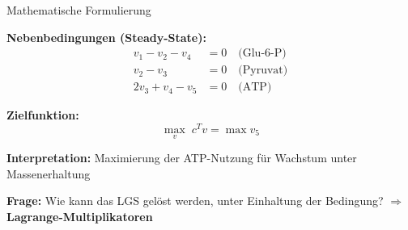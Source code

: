 \begin{frame}{Mathematische Formulierung}

\textbf{Nebenbedingungen (Steady-State):}
\[
\begin{aligned}
v_1 - v_2 - v_4 &= 0 \quad \text{(Glu-6-P)} \\
v_2 - v_3 &= 0 \quad \text{(Pyruvat)} \\
2v_3 + v_4 - v_5 &= 0 \quad \text{(ATP)}
\end{aligned}
\]

\textbf{Zielfunktion:}
\[
\max_{v} \; c^T v = \max v_5
\]

\textbf{Interpretation:} Maximierung der ATP-Nutzung für Wachstum unter Massenerhaltung

\textbf{Frage:} Wie kann das LGS gelöst werden, unter Einhaltung der Bedingung? 
$\Rightarrow$ {\bf Lagrange-Multiplikatoren}

\end{frame}

